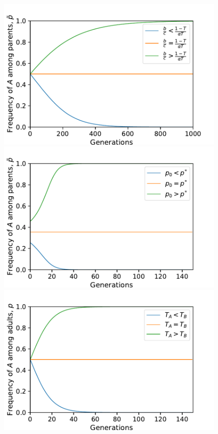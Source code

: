 \documentclass[12pt]{extarticle}
\begin{document}
{%
\begin{figure}[h]
  \centering
    \includegraphics[scale=0.7]{Time_Figure_Equal_Horizontal.pdf}
    \includegraphics[scale=0.7]{Time_Figure_Only_Vertical_No_Alpha.pdf}
    \includegraphics[scale=0.7]{Time_Figure_No_Vertical.pdf}

\end{figure}}
\end{document}
